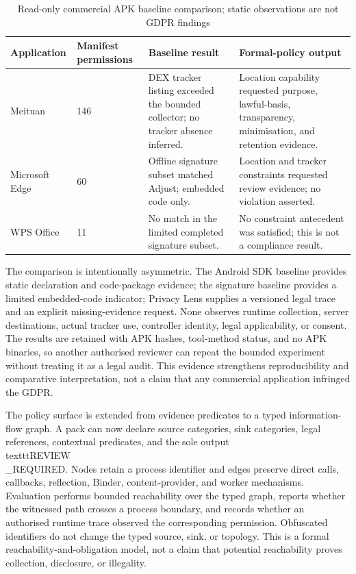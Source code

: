 \begin{table}[H]
\centering
\small
\caption{Read-only commercial APK baseline comparison; static observations are not GDPR findings}
\label{tab:commercial-apk-baseline}
\begin{tabular}{p{}p{}p{}p{}}
\toprule
Application & Manifest permissions & Baseline result & Formal-policy output \\
\midrule
Meituan & 146 & DEX tracker listing exceeded the bounded collector; no tracker absence inferred. & Location capability requested purpose, lawful-basis, transparency, minimisation, and retention evidence. \\
Microsoft Edge & 60 & Offline signature subset matched Adjust; embedded code only. & Location and tracker constraints requested review evidence; no violation asserted. \\
WPS Office & 11 & No match in the limited completed signature subset. & No constraint antecedent was satisfied; this is not a compliance result. \\
\bottomrule
\end{tabular}
\end{table}

The comparison is intentionally asymmetric. The Android SDK baseline provides static declaration and code-package evidence; the signature baseline provides a limited embedded-code indicator; Privacy Lens supplies a versioned legal trace and an explicit missing-evidence request. None observes runtime collection, server destinations, actual tracker use, controller identity, legal applicability, or consent. The results are retained with APK hashes, tool-method status, and no APK binaries, so another authorised reviewer can repeat the bounded experiment without treating it as a legal audit. This evidence strengthens reproducibility and comparative interpretation, not a claim that any commercial application infringed the GDPR.

The policy surface is extended from evidence predicates to a typed information-flow graph. A pack can now declare source categories, sink categories, legal references, contextual predicates, and the sole output \\texttt{REVIEW\\_REQUIRED}. Nodes retain a process identifier and edges preserve direct calls, callbacks, reflection, Binder, content-provider, and worker mechanisms. Evaluation performs bounded reachability over the typed graph, reports whether the witnessed path crosses a process boundary, and records whether an authorised runtime trace observed the corresponding permission. Obfuscated identifiers do not change the typed source, sink, or topology. This is a formal reachability-and-obligation model, not a claim that potential reachability proves collection, disclosure, or illegality.


